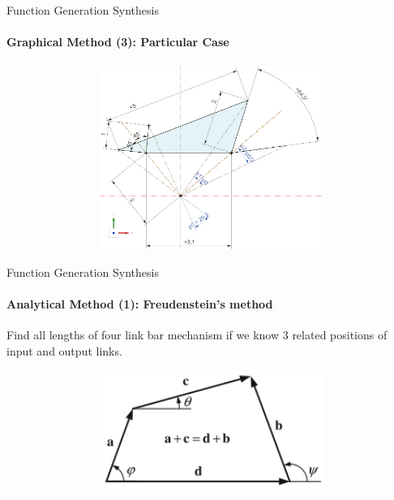 \documentclass[aspectratio=169]{beamer}
\begin{document}
\begin{frame}[t]{Function Generation Synthesis}
    \framesubtitle{Graphical Method (3): Particular Case}
    \vspace{-0.8cm}
    \begin{figure}[H]
        \centering\includegraphics[height=6cm,width=1\textwidth,keepaspectratio]{func_gen8.png}
        \label{fig:func_gen8.png}
    \end{figure}
\end{frame}

\begin{frame}[t]{Function Generation Synthesis}
    \framesubtitle{Analytical Method (1): Freudenstein's method}
    Find all lengths of four link bar mechanism if we know 3 related positions of input and output links.
    \begin{figure}[H]
        \centering\includegraphics[height=4cm,width=1\textwidth,keepaspectratio]{func_gen9.png}
        \label{fig:func_gen9.png}
    \end{figure}
\end{frame}
\end{document}
